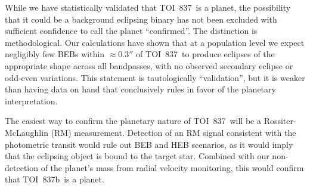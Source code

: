 \documentclass[12pt,twocolumn,tighten]{aastex63}
\newcommand{\tn}{TOI~837} %
\newcommand{\pn}{TOI~837b} %
\begin{document}

While we have statistically validated that \tn\ is a planet, the
possibility that it could be a background eclipsing binary has not
been excluded with sufficient confidence to call the planet
``confirmed''.  The distinction is methodological.  Our calculations
have shown that at a population level we expect negligibly few BEBs
within $\approx0.3''$ of \tn\ to produce eclipses of the appropriate
shape across all bandpasses, with no observed secondary eclipse or
odd-even variations.  This statement is
tautologically ``validation'', but it is weaker than having data on
hand that conclusively rules in favor of the planetary interpretation.

The easiest way to confirm the planetary nature of \tn\
will be a Rossiter-McLaughlin (RM) measurement.  Detection of an RM
signal consistent with the photometric transit would rule out BEB and
HEB scenarios, as it would imply that the eclipsing object is bound to
the target star. Combined with our non-detection of the planet's mass
from radial velocity monitoring, this would confirm that \pn\ is a
planet.
\end{document}
